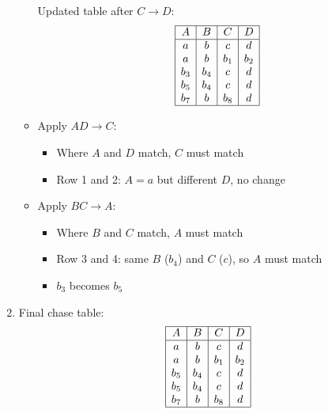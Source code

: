 \documentclass{article}
\begin{document}
\begin{example}
\begin{enumerate}
\begin{itemize}
          Updated table after $C \rightarrow D$:
          \[
          \begin{array}{|c|c|c|c|}
          \hline
          A & B & C & D \\
          \hline
          a & b & c & d \\
          a & b & b_1 & b_2 \\
          b_3 & b_4 & c & d \\
          b_5 & b_4 & c & d \\
          b_7 & b & b_8 & d \\
          \hline
          \end{array}
          \]

          \item Apply $AD \rightarrow C$:
              \begin{itemize}
              \item Where $A$ and $D$ match, $C$ must match
              \item Row 1 and 2: $A=a$ but different $D$, no change
              \end{itemize}

          \item Apply $BC \rightarrow A$:
              \begin{itemize}
              \item Where $B$ and $C$ match, $A$ must match
              \item Row 3 and 4: same $B$ ($b_4$) and $C$ ($c$), so $A$ must match
              \item $b_3$ becomes $b_5$
              \end{itemize}
      \end{itemize}

      \item Final chase table:
          \[
          \begin{array}{|c|c|c|c|}
          \hline
          A & B & C & D \\
          \hline
          a & b & c & d \\
          a & b & b_1 & b_2 \\
          b_5 & b_4 & c & d \\
          b_5 & b_4 & c & d \\
          b_7 & b & b_8 & d \\
          \hline
          \end{array}
          \]


\end{enumerate}
\end{example}
\end{document}
